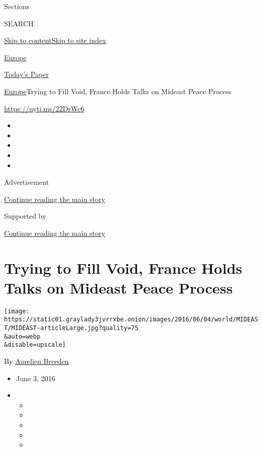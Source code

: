 Sections

SEARCH

\protect\hyperlink{site-content}{Skip to
content}\protect\hyperlink{site-index}{Skip to site index}

\href{https://www.nytimes3xbfgragh.onion/section/world/europe}{Europe}

\href{https://myaccount.nytimes3xbfgragh.onion/auth/login?response_type=cookie\&client_id=vi}{}

\href{https://www.nytimes3xbfgragh.onion/section/todayspaper}{Today's
Paper}

\href{/section/world/europe}{Europe}\textbar{}Trying to Fill Void,
France Holds Talks on Mideast Peace Process

\url{https://nyti.ms/22DrWc6}

\begin{itemize}
\item
\item
\item
\item
\item
\end{itemize}

Advertisement

\protect\hyperlink{after-top}{Continue reading the main story}

Supported by

\protect\hyperlink{after-sponsor}{Continue reading the main story}

\hypertarget{trying-to-fill-void-france-holds-talks-on-mideast-peace-process}{%
\section{Trying to Fill Void, France Holds Talks on Mideast Peace
Process}\label{trying-to-fill-void-france-holds-talks-on-mideast-peace-process}}

\texttt{[image: https://static01.graylady3jvrrxbe.onion/images/2016/06/04/world/MIDEAST/MIDEAST-articleLarge.jpg?quality=75\\\&auto=webp\\\&disable=upscale]}

By
\href{https://www.nytimes3xbfgragh.onion/by/aurelien-breeden}{Aurelien
Breeden}

\begin{itemize}
\item
  June 3, 2016
\item
  \begin{itemize}
  \item
  \item
  \item
  \item
  \item
  \end{itemize}
\end{itemize}

